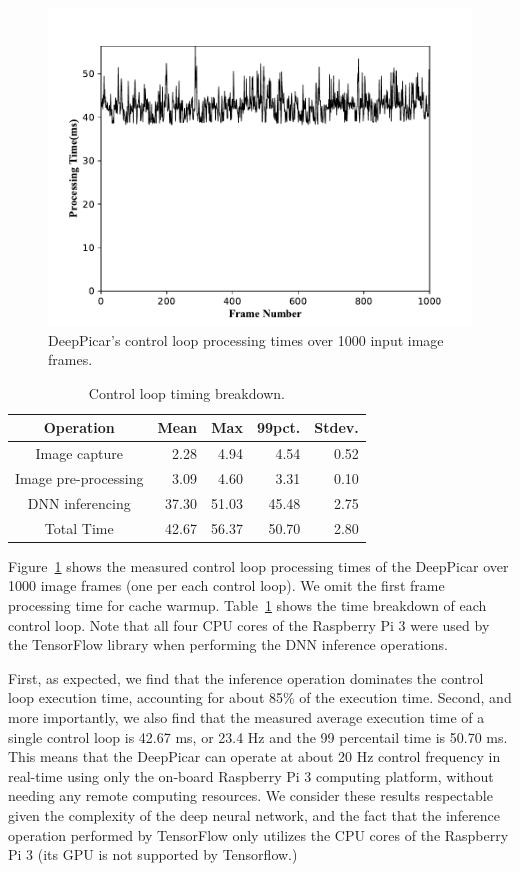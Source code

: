 
\begin{figure}[t]
  \centering
  \includegraphics[width=.5\textwidth]{figs/Fig7_new}
  \caption{DeepPicar's control loop processing times over 1000 input image frames.}
  \label{fig:control-loop-timing}
\end{figure}

\begin{table}[t]
  \centering
  \begin{tabular} {| c | r | r | r | r |}
    \hline
    \textbf{Operation} & \textbf{Mean} & \textbf{Max} &   \textbf{99pct.} & \textbf{Stdev.} \\ \hline
    Image capture        & 2.28  &  4.94 &  4.54  & 0.52 \\ \hline
    Image pre-processing & 3.09  &  4.60 &  3.31  & 0.10 \\ \hline
    DNN inferencing      & 37.30 & 51.03 & 45.48  & 2.75 \\ \hline
    Total Time           & 42.67 & 56.37 & 50.70  & 2.80 \\ \hline
  \end{tabular}
  \caption{Control loop timing breakdown.}
  \label{tbl:control-loop-breakdown}
\end{table}

Figure~\ref{fig:control-loop-timing} shows the measured control loop 
processing times of the DeepPicar over 1000 image frames (one per each
control loop). We omit the first frame processing time for cache
warmup. Table~\ref{tbl:control-loop-breakdown} shows the time
breakdown of each control loop. Note that all four CPU cores of the
Raspberry Pi 3 were used by the TensorFlow library when performing the
DNN inference operations.

First, as expected, we find that the inference operation
dominates the control loop execution time, accounting for about 85\% of
the execution time.
Second, and more importantly, we also find that the measured average
execution time of a single control loop is 42.67 ms, or 23.4 Hz and
the 99 percentail time is 50.70 ms.
This means that the DeepPicar can operate
at about 20 Hz control frequency in real-time using only the on-board
Raspberry Pi 3 computing platform, without needing any remote computing
resources. We consider these results respectable given the complexity
of the deep neural network, and the fact that the inference operation
performed by TensorFlow only utilizes the CPU cores of the
Raspberry Pi 3 (its GPU is not supported by Tensorflow.)

